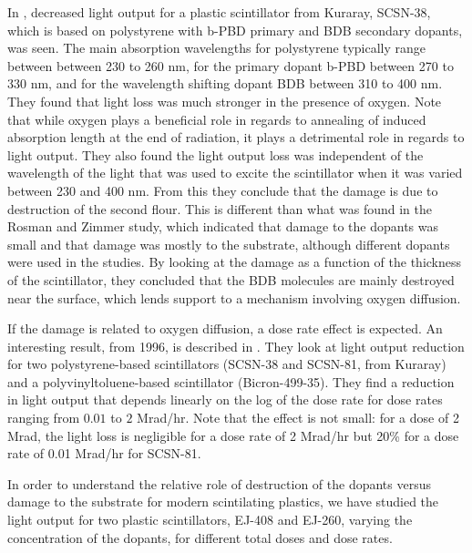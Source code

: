 \documentclass[review]{elsarticle}
\begin{document}
In \cite{Wick1991472}, decreased light
output for a plastic scintillator from Kuraray, SCSN-38, which
is based on polystyrene with b-PBD primary and BDB secondary dopants, was seen.
The main absorption wavelengths for polystyrene typically range between
between 230 to 260 nm, for the primary dopant b-PBD between 270 to 330 nm,
and for the wavelength shifting dopant BDB between 310 to 400 nm.
They found that light loss was much stronger in the presence of oxygen.
Note that while oxygen plays a beneficial role in regards
to annealing of induced absorption length at the end of radiation, 
it plays a detrimental role in 
regards to light output.  
They also found the light output loss
was independent of the wavelength of the light
that was used to excite the scintillator when it
was varied between 230 and 400 nm.
From this they conclude that the damage is due to destruction
of the second flour.  This is different than what was found in
the Rosman and Zimmer study, which indicated that damage to the dopants was
small and that damage was mostly to the substrate,
although different dopants were used in the studies.
By looking at the damage as a function of the thickness of the scintillator,
they concluded that the BDB molecules are mainly destroyed
near the surface, which lends support to a mechanism involving
oxygen diffusion.

If the damage is related to oxygen diffusion, a dose rate effect
is expected.
An interesting result, from 1996, is described in \cite{Biagtan1996125}.  They look at light output reduction for two
polystyrene-based scintillators (SCSN-38 and SCSN-81, from Kuraray) and a
polyvinyltoluene-based scintillator (Bicron-499-35).  
They find a reduction in light output that depends linearly on the
log of the dose rate for dose rates ranging from $0.01$ to
$2$ Mrad/hr.  Note that the effect is not small: for a
dose of 2 Mrad, the light loss is negligible for a dose rate
of 2 Mrad/hr but 20\% for a dose rate of 0.01 Mrad/hr for SCSN-81.

In order to understand the relative role of destruction of the dopants versus damage to the substrate for modern scintilating plastics,
we have studied the light output for two plastic scintillators, EJ-408 and EJ-260, varying the concentration of the dopants, for
different total doses and dose rates.  
\end{document}
